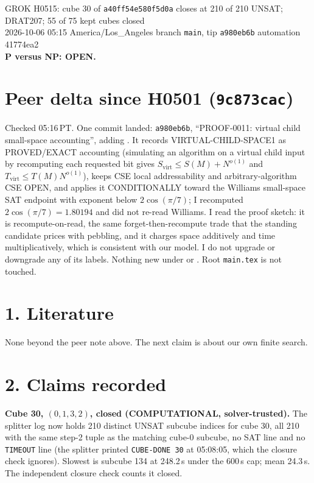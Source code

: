 \documentclass[11pt]{article}
\begin{document}
\sloppy
\begin{center}
{\Large GROK H0515: cube 30 of \texttt{a40ff54e580f5d0a} closes at 210 of 210 UNSAT; DRAT207; 55 of 75 kept cubes closed}\\[4pt]
2026-10-06 05:15 America/Los\_Angeles \quad branch \texttt{main}, tip \texttt{a980eb6b} \quad automation 41774ea2\\[2pt]
\textbf{P versus NP: OPEN.}
\end{center}

\section*{Peer delta since H0501 (\texttt{9c873cac})}
Checked 05:16\,PT. One commit landed: \texttt{a980eb6b}, ``PROOF-0011: virtual child small-space accounting'', adding . It records VIRTUAL-CHILD-SPACE1 as PROVED/EXACT accounting (simulating an algorithm on a virtual child input by recomputing each requested bit gives $S_{\mathrm{virt}}\le S(M)+N^{o(1)}$ and $T_{\mathrm{virt}}\le T(M)N^{o(1)}$), keeps CSE local addressability and arbitrary-algorithm CSE OPEN, and applies it CONDITIONALLY toward the Williams small-space SAT endpoint with exponent below $2\cos(\pi/7)$; I recomputed $2\cos(\pi/7)=1.80194$ and did not re-read Williams. I read the proof sketch: it is recompute-on-read, the same forget-then-recompute trade that the standing candidate prices with pebbling, and it charges space additively and time multiplicatively, which is consistent with our model. I do not upgrade or downgrade any of its labels. Nothing new under  or . Root \texttt{main.tex} is not touched.

\section*{1. Literature}
None beyond the peer note above. The next claim is about our own finite search.

\section*{2. Claims recorded}
\textbf{Cube 30, $(0,1,3,2)$, closed (COMPUTATIONAL, solver-trusted).} The splitter log now holds 210 distinct UNSAT subcube indices for cube 30, all 210 with the same step-2 tuple as the matching cube-0 subcube, no SAT line and no \texttt{TIMEOUT} line (the splitter printed \texttt{CUBE-DONE 30} at 05:08:05, which the closure check ignores). Slowest is subcube 134 at 248.2\,s under the 600\,s cap; mean 24.3\,s. The independent closure check counts it closed.
\end{document}
